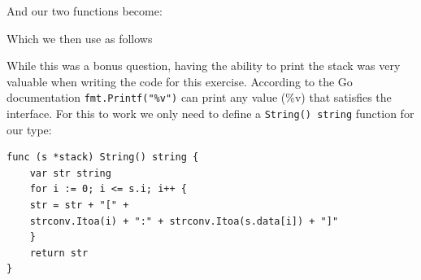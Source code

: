 \begin{Answer}
\noindent{}And our two functions become:

Which we then use as follows


\Question While this was a bonus question, having the ability to print
the stack was very valuable when writing the code for this exercise.
According to the Go documentation \lstinline{fmt.Printf("%v")} can
print any value (\%v) that satisfies the  interface.
For this to work we only need to define a \lstinline{String() string} function for
our type:
\begin{lstlisting}
func (s *stack) String() string {
	var str string
	for i := 0; i <= s.i; i++ {
	str = str + "[" +
	strconv.Itoa(i) + ":" + strconv.Itoa(s.data[i]) + "]"
	}
	return str
}
\end{lstlisting}
\end{Answer}
